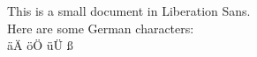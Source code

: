 \documentclass{article}
\begin{document}
This is a small document in Liberation Sans.
\\
Here are some German characters:
\\
äÄ öÖ üÜ ß
\end{document}
